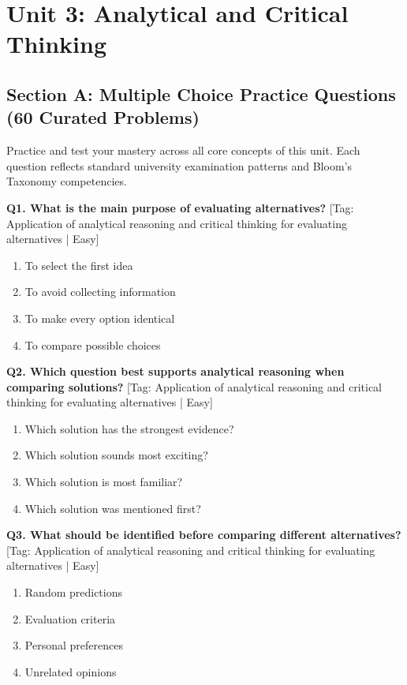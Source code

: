 \chapter{Unit 3: Analytical and Critical Thinking}


\section{Section A: Multiple Choice Practice Questions (60 Curated Problems)}

\noindent Practice and test your mastery across all core concepts of this unit. Each question reflects standard university examination patterns and Bloom's Taxonomy competencies.
\vspace{3mm}

\noindent\textbf{Q1. What is the main purpose of evaluating alternatives?} \hfill [Tag: Application of analytical reasoning and critical thinking for evaluating alternatives | Easy]
\begin{enumerate}[label=(\alph*),topsep=2pt,itemsep=1pt,partopsep=0pt,parsep=0pt]
    \item {To select the first idea}
    \item {To avoid collecting information}
    \item {To make every option identical}
    \item {To compare possible choices}
\end{enumerate}
\vspace{2mm}

\noindent\textbf{Q2. Which question best supports analytical reasoning when comparing solutions?} \hfill [Tag: Application of analytical reasoning and critical thinking for evaluating alternatives | Easy]
\begin{enumerate}[label=(\alph*),topsep=2pt,itemsep=1pt,partopsep=0pt,parsep=0pt]
    \item {Which solution has the strongest evidence?}
    \item {Which solution sounds most exciting?}
    \item {Which solution is most familiar?}
    \item {Which solution was mentioned first?}
\end{enumerate}
\vspace{2mm}

\noindent\textbf{Q3. What should be identified before comparing different alternatives?} \hfill [Tag: Application of analytical reasoning and critical thinking for evaluating alternatives | Easy]
\begin{enumerate}[label=(\alph*),topsep=2pt,itemsep=1pt,partopsep=0pt,parsep=0pt]
    \item {Random predictions}
    \item {Evaluation criteria}
    \item {Personal preferences}
    \item {Unrelated opinions}
\end{enumerate}
\vspace{2mm}

